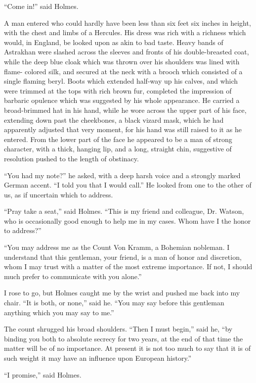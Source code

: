 “Come in!” said Holmes.

A man entered who could hardly have been less than six
feet six inches in height, with the chest and limbs of a
Hercules. His dress was rich with a richness which would,
in England, be looked upon as akin to bad taste. Heavy
bands of Astrakhan were slashed across the sleeves and
fronts of his double-breasted coat, while the deep blue cloak
which was thrown over his shoulders was lined with flame-%
colored silk, and secured at the neck with a brooch which
consisted of a single flaming beryl. Boots which extended
half-way up his calves, and which were trimmed at the tops
with rich brown fur, completed the impression of barbaric
opulence which was suggested by his whole appearance. He
carried a broad-brimmed hat in his hand, while he wore across
the upper part of his face, extending down past the cheekbones,
a black vizard mask, which he had apparently adjusted
that very moment, for his hand was still raised to it as he
entered. From the lower part of the face he appeared to be
a man of strong character, with a thick, hanging lip, and a
long, straight chin, suggestive of resolution pushed to the
length of obstinacy.

“You had my note?” he asked, with a deep harsh voice
and a strongly marked German accent. “I told you that I
would call.” He looked from one to the other of us, as if
uncertain which to address.

“Pray take a seat,” said Holmes. “This is my friend and
colleague, Dr. Watson, who is occasionally good enough to
help me in my cases. Whom have I the honor to address?”

“You may address me as the Count Von Kramm, a Bohemian
nobleman. I understand that this gentleman, your
friend, is a man of honor and discretion, whom I may trust
with a matter of the most extreme importance. If not, I
should much prefer to communicate with you alone.”

I rose to go, but Holmes caught me by the wrist and pushed
me back into my chair. “It is both, or none,” said he.
“You may say before this gentleman anything which you may
say to me.”

The count shrugged his broad shoulders. “Then I must
begin,” said he, “by binding you both to absolute secrecy for
two years, at the end of that time the matter will be of no
importance. At present it is not too much to say that it is of
such weight it may have an influence upon European history.”

“I promise,” said Holmes.

